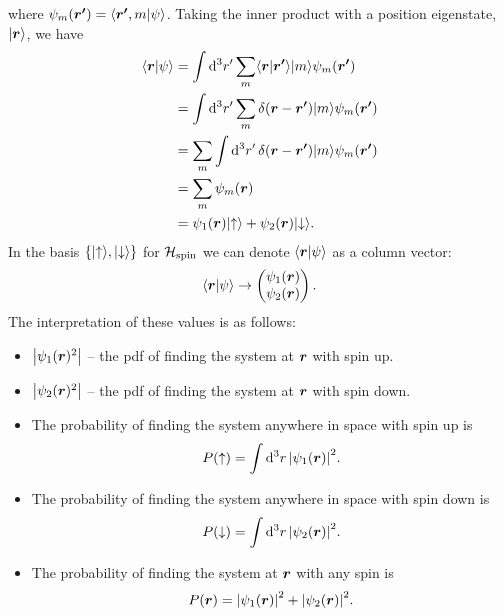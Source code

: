 where \(\psi_m(\bm{r'}) = \langle {\bm{r'}, m} \vert {\psi} \rangle\).
Taking the inner product with a position eigenstate, \(\vert {\bm{r}} \rangle\), we have
\begin{align*}
    \langle {\bm{r}} \vert {\psi} \rangle &= \int \dd[3]{r'}\sum_m \langle {\bm{r}} \vert {\bm{r'}} \rangle\vert {m} \rangle\psi_m(\bm{r'})\\
    &= \int \dd[3]{r'} \sum_m \delta(\bm{r} - \bm{r'})\vert {m} \rangle\psi_m(\bm{r'})\\
    &= \sum_m \int \dd[3]{r'} \delta(\bm{r} - \bm{r'})\vert {m} \rangle\psi_m(\bm{r'})\\
    &= \sum_m \psi_m(\bm{r})\\
    &= \psi_1(\bm{r})\vert {\uparrow} \rangle + \psi_2(\bm{r})\vert {\downarrow} \rangle.
\end{align*}
In the basis \(\{\vert {\uparrow} \rangle, \vert {\downarrow} \rangle\}\) for \(\mathcal{H}_\text{spin}\) we can denote \(\langle {\bm{r}} \vert {\psi} \rangle\) as a column vector:
\[
\langle {\bm{r}} \vert {\psi} \rangle \mathrel{\rightarrow} 
\begin{pmatrix}
    \psi_1(\bm{r})\\ \psi_2(\bm{r})
\end{pmatrix}
.
\]
The interpretation of these values is as follows:
\begin{itemize}
    \item \(\abs{\psi_1(\bm{r})^2}\) -- the \gls{pdf} of finding the system at \(\bm{r}\) with spin up.
    \item \(\abs{\psi_2(\bm{r})^2}\) -- the \gls{pdf} of finding the system at \(\bm{r}\) with spin down.
    \item The probability of finding the system anywhere in space with spin up is
    \[P(\uparrow) = \int\dd[3]{r}\abs{\psi_1(\bm{r})}^2.\]
    \item The probability of finding the system anywhere in space with spin down is
    \[P(\downarrow) = \int\dd[3]{r}\abs{\psi_2(\bm{r})}^2.\]
    \item The probability of finding the system at \(\bm{r}\) with any spin is
    \[P(\bm{r}) = \abs{\psi_1(\bm{r})}^2 + \abs{\psi_2(\bm{r})}^2.\] 
\end{itemize}

